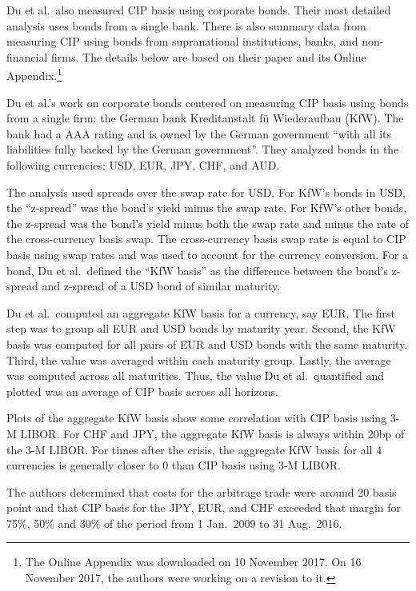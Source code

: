 Du et al.\ also measured CIP basis using corporate bonds.  Their most detailed analysis uses bonds from a single bank.  There is also summary data from measuring CIP using bonds from supranational institutions, banks, and non-financial firms.  The details below are based on their paper and its Online Appendix.\footnote{The Online Appendix was downloaded on 10 November 2017.  On 16 November 2017, the authors were working on a revision to it.\cite{Du_email1}}

Du et al.'s work on corporate bonds centered on measuring CIP basis using bonds from a single firm: the German bank Kreditanstalt f\"u Wiederaufbau (KfW).\cite{Du2017}  The bank had a AAA rating and is owned by the German government ``with all its liabilities fully backed by the German government''.\cite{Du2017}    They analyzed bonds in the following currencies: USD, EUR, JPY, CHF, and AUD.  

The analysis used spreads over the swap rate for USD.  For KfW's bonds in USD, the ``z-spread'' was the bond's yield minus the swap rate.  For KfW's other bonds, the z-spread was the bond's yield minus both the swap rate and minus the rate of the cross-currency basis swap.  The cross-currency basis swap rate is equal to CIP basis using swap rates and was used to account for the currency conversion.   For a bond, Du et al.\ defined the ``KfW basis'' as the difference between the bond's z-spread and z-spread of a USD bond of similar maturity.

Du et al.\ computed an aggregate KfW basis for a currency, say EUR.  The first step was to group all EUR and USD bonds by maturity year.  Second, the KfW basis was computed for all pairs of EUR and USD bonds with the same maturity.  Third, the value was averaged within each maturity group.  Lastly, the average was computed across all maturities.\cite{Du_email1}   Thus, the value Du et al.\ quantified and plotted was an average of CIP basis across all horizons.

Plots of the aggregate KfW basis show some correlation with CIP basis using 3-M LIBOR.  For CHF and JPY, the aggregate KfW basis is always within 20bp of the 3-M LIBOR.    For times after the crisis, the aggregate KfW basis for all 4 currencies is generally closer to 0 than CIP basis using 3-M LIBOR.  

The authors determined that costs for the arbitrage trade were around 20 basis point and that CIP basis for the JPY, EUR, and CHF exceeded that margin for 75\%, 50\% and 30\% of the period from 1 Jan.\ 2009 to 31 Aug.\ 2016.   


